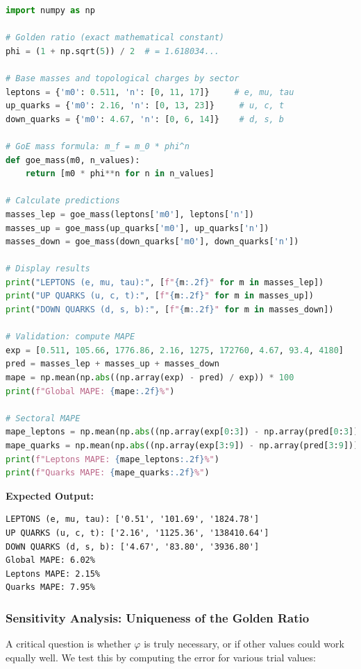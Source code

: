 \documentclass[12pt]{article}
\begin{document}
\begin{lstlisting}[language=Python, caption=GoE Fermion Mass Calculator (Minimal Version)]
import numpy as np

# Golden ratio (exact mathematical constant)
phi = (1 + np.sqrt(5)) / 2  # = 1.618034...

# Base masses and topological charges by sector
leptons = {'m0': 0.511, 'n': [0, 11, 17]}     # e, mu, tau
up_quarks = {'m0': 2.16, 'n': [0, 13, 23]}     # u, c, t
down_quarks = {'m0': 4.67, 'n': [0, 6, 14]}    # d, s, b

# GoE mass formula: m_f = m_0 * phi^n
def goe_mass(m0, n_values):
    return [m0 * phi**n for n in n_values]

# Calculate predictions
masses_lep = goe_mass(leptons['m0'], leptons['n'])
masses_up = goe_mass(up_quarks['m0'], up_quarks['n'])
masses_down = goe_mass(down_quarks['m0'], down_quarks['n'])

# Display results
print("LEPTONS (e, mu, tau):", [f"{m:.2f}" for m in masses_lep])
print("UP QUARKS (u, c, t):", [f"{m:.2f}" for m in masses_up])
print("DOWN QUARKS (d, s, b):", [f"{m:.2f}" for m in masses_down])

# Validation: compute MAPE
exp = [0.511, 105.66, 1776.86, 2.16, 1275, 172760, 4.67, 93.4, 4180]
pred = masses_lep + masses_up + masses_down
mape = np.mean(np.abs((np.array(exp) - pred) / exp)) * 100
print(f"Global MAPE: {mape:.2f}%")

# Sectoral MAPE
mape_leptons = np.mean(np.abs((np.array(exp[0:3]) - np.array(pred[0:3])) / np.array(exp[0:3]))) * 100
mape_quarks = np.mean(np.abs((np.array(exp[3:9]) - np.array(pred[3:9])) / np.array(exp[3:9]))) * 100
print(f"Leptons MAPE: {mape_leptons:.2f}%")
print(f"Quarks MAPE: {mape_quarks:.2f}%")
\end{lstlisting}

\textbf{Expected Output:}
\begin{verbatim}
LEPTONS (e, mu, tau): ['0.51', '101.69', '1824.78']
UP QUARKS (u, c, t): ['2.16', '1125.36', '138410.64']
DOWN QUARKS (d, s, b): ['4.67', '83.80', '3936.80']
Global MAPE: 6.02%
Leptons MAPE: 2.15%
Quarks MAPE: 7.95%
\end{verbatim}

\subsubsection{Sensitivity Analysis: Uniqueness of the Golden Ratio}

A critical question is whether $\varphi$ is truly necessary, or if other values could work equally well. We test this by computing the error for various trial values:
\end{document}
